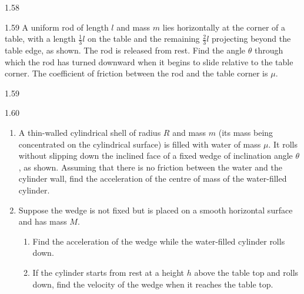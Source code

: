 \begin{figbox}{1.58}
\end{figbox}

\begin{problem}{1.59}
A uniform rod of length $l$ and mass $m$ lies horizontally at the corner of a table, with a length $\frac{1}{3}l$ on the table and the remaining $\frac{2}{3}l$ projecting beyond the table edge, as shown. The rod is released from rest. Find the angle $\theta$ through which the rod has turned downward when it begins to slide relative to the table corner. The coefficient of friction between the rod and the table corner is $\mu$.
\end{problem}

\begin{figbox}{1.59}
\end{figbox}

\begin{problem}{1.60}
\begin{enumerate}[label=(\arabic*),leftmargin=2.2em,itemsep=1pt,topsep=2pt]
\item A thin-walled cylindrical shell of radius $R$ and mass $m$ (its mass being concentrated on the cylindrical surface) is filled with water of mass $\mu$. It rolls without slipping down the inclined face of a fixed wedge of inclination angle $\theta$, as shown. Assuming that there is no friction between the water and the cylinder wall, find the acceleration of the centre of mass of the water-filled cylinder.
\item Suppose the wedge is not fixed but is placed on a smooth horizontal surface and has mass $M$.
\begin{enumerate}[label=(\roman*),leftmargin=2.2em,itemsep=1pt,topsep=2pt]
\item Find the acceleration of the wedge while the water-filled cylinder rolls down.
\item If the cylinder starts from rest at a height $h$ above the table top and rolls down, find the velocity of the wedge when it reaches the table top.
\end{enumerate}
\end{enumerate}
\end{problem}

